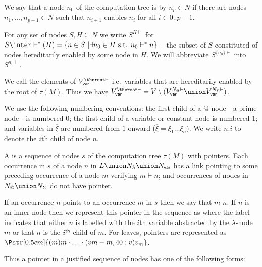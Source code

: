 We say that a node $n_0$ of the computation tree is  by $n_p \in N$ if there are nodes $n_1,\ldots, n_{p-1} \in N$ such that $n_{i+1}$ enables $n_{i}$
for all $i\in 0..p-1$.

For any set of nodes $S, H \subseteq N$ we write $S^{H\vdash}$ for $S \inter \vdash^*(H) = \{ n \in S \ | \exists n_0 \in H \mbox{ s.t. }n_0  \vdash^* n \}$ -- the subset of $S$ constituted of nodes hereditarily enabled by some node in $H$. We will abbreviate $S^{\{n_0\}\vdash}$ into $S^{n_0\vdash}$.

We call  the elements of $V_{\sf var}^{\theroot\vdash}$ i.e.\
variables that are hereditarily enabled by the root of $\tau(M)$. Thus we have
$V_{\sf var}^{\theroot\vdash} = V \setminus ( V_{\sf var}^{N_@\vdash}
\union V_{\sf var}^{N_\Sigma\vdash})$.
\smallskip

We use the following numbering conventions:
the first child of a @-node - a prime node - is numbered $0$;
the first child of a variable or constant node is numbered $1$;
and variables in $\overline{\xi}$ are numbered from $1$ onward ($\overline{\xi} = \xi_1 \ldots \xi_n$).
We write $n.i$ to denote the $i$th child of node $n$.

\begin{definition}
\label{dfn:justseqnode} A  is a
sequence of nodes $s$ of the computation tree $\tau(M)$ with
pointers. Each occurrence in $s$ of a node $n$
in $L \union N_\lambda \union N_{\sf var}$ has a link pointing to some preceding occurrence of a node $m$ verifying $m \vdash n$;
and occurrences of nodes in $N_@ \union N_\Sigma$ do not have pointer.

If an occurrence $n$ points to an occurrence $m$ in $s$ then we say that $m$  $n$.
If $n$ is an inner node then we represent this pointer in the sequence as  where the label indicates that either $n$ is labelled with the $i$th variable abstracted by the
$\lambda$-node $m$ or that $n$ is the $i^{\sf th}$ child of $m$.
For leaves, pointers are represented as
$\Pstr[0.5cm]{ (m){m} \cdot \ldots \cdot (vm-m,40:v){v_m} }$.
\end{definition}

Thus a pointer in a justified sequence of nodes has
one of the following forms:
\smallskip

